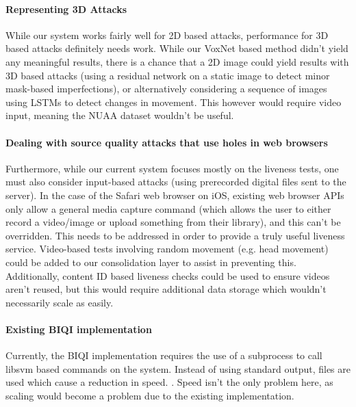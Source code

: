 \documentclass[10pt,a4paper]{article}
\begin{document}
    \paragraph{Representing 3D Attacks}
    While our system works fairly well for 2D based attacks, performance for 3D based attacks definitely needs work.
    While our VoxNet based method didn't yield any meaningful results, there is a chance that a 2D image could yield results
    with 3D based attacks (using a residual network on a static image to detect minor mask-based imperfections), or alternatively
    considering a sequence of images using LSTMs to detect changes in movement. This however would require video input, meaning the
    NUAA dataset wouldn't be useful.

    \paragraph{Dealing with source quality attacks that use holes in web browsers}
    Furthermore, while our current system focuses mostly on the liveness tests, one must also consider input-based attacks (using prerecorded digital files
    sent to the server). In the case of the Safari web browser on iOS, existing web browser APIs only allow a general media capture command (which allows the user to
    either record a video/image or upload something from their library), and this can't be overridden. This needs to be addressed in order to provide a truly useful
    liveness service. Video-based tests involving random movement (e.g. head movement) could be added to our consolidation layer to assist in preventing this. Additionally, content ID
    based liveness checks could be used to ensure videos aren't reused, but this would require additional data storage which wouldn't necessarily scale as easily.

    \paragraph{Existing BIQI implementation}
    Currently, the BIQI implementation requires the use of a subprocess to call libsvm based commands on the system. Instead of using standard output, files are used which
    cause a reduction in speed.
    .
    Speed isn't the only problem here, as scaling would become a problem due to the existing implementation. 
\end{document}
